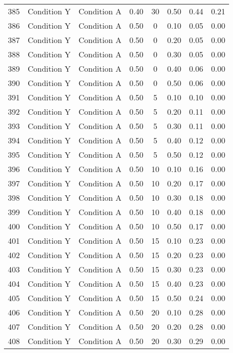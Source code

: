 \begin{landscape}
\begin{longtable}{cc cc cc cc}
  385 & Condition Y & Condition A & 0.40 &  30 & 0.50 & 0.44 & 0.21 \\ 
  386 & Condition Y & Condition A & 0.50 &   0 & 0.10 & 0.05 & 0.00 \\ 
  387 & Condition Y & Condition A & 0.50 &   0 & 0.20 & 0.05 & 0.00 \\ 
  388 & Condition Y & Condition A & 0.50 &   0 & 0.30 & 0.05 & 0.00 \\ 
  389 & Condition Y & Condition A & 0.50 &   0 & 0.40 & 0.06 & 0.00 \\ 
  390 & Condition Y & Condition A & 0.50 &   0 & 0.50 & 0.06 & 0.00 \\ 
  391 & Condition Y & Condition A & 0.50 &   5 & 0.10 & 0.10 & 0.00 \\ 
  392 & Condition Y & Condition A & 0.50 &   5 & 0.20 & 0.11 & 0.00 \\ 
  393 & Condition Y & Condition A & 0.50 &   5 & 0.30 & 0.11 & 0.00 \\ 
  394 & Condition Y & Condition A & 0.50 &   5 & 0.40 & 0.12 & 0.00 \\ 
  395 & Condition Y & Condition A & 0.50 &   5 & 0.50 & 0.12 & 0.00 \\ 
  396 & Condition Y & Condition A & 0.50 &  10 & 0.10 & 0.16 & 0.00 \\ 
  397 & Condition Y & Condition A & 0.50 &  10 & 0.20 & 0.17 & 0.00 \\ 
  398 & Condition Y & Condition A & 0.50 &  10 & 0.30 & 0.18 & 0.00 \\ 
  399 & Condition Y & Condition A & 0.50 &  10 & 0.40 & 0.18 & 0.00 \\ 
  400 & Condition Y & Condition A & 0.50 &  10 & 0.50 & 0.17 & 0.00 \\ 
  401 & Condition Y & Condition A & 0.50 &  15 & 0.10 & 0.23 & 0.00 \\ 
  402 & Condition Y & Condition A & 0.50 &  15 & 0.20 & 0.23 & 0.00 \\ 
  403 & Condition Y & Condition A & 0.50 &  15 & 0.30 & 0.23 & 0.00 \\ 
  404 & Condition Y & Condition A & 0.50 &  15 & 0.40 & 0.23 & 0.00 \\ 
  405 & Condition Y & Condition A & 0.50 &  15 & 0.50 & 0.24 & 0.00 \\ 
  406 & Condition Y & Condition A & 0.50 &  20 & 0.10 & 0.28 & 0.00 \\ 
  407 & Condition Y & Condition A & 0.50 &  20 & 0.20 & 0.28 & 0.00 \\ 
  408 & Condition Y & Condition A & 0.50 &  20 & 0.30 & 0.29 & 0.00 \\ 

\end{longtable}
\end{landscape}

